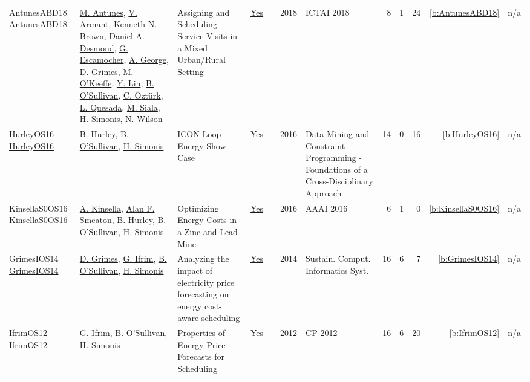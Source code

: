 {\begin{longtable}{>{\raggedright\arraybackslash}p{3cm}>{\raggedright\arraybackslash}p{6cm}>{\raggedright\arraybackslash}p{6.5cm}rrrp{2.5cm}rrrrr}
AntunesABD18 \href{https://doi.org/10.1109/ICTAI.2018.00027}{AntunesABD18} & \hyperref[auth:a884]{M. Antunes}, \hyperref[auth:a885]{V. Armant}, \hyperref[auth:a222]{Kenneth N. Brown}, \hyperref[auth:a886]{Daniel A. Desmond}, \hyperref[auth:a887]{G. Escamocher}, \hyperref[auth:a888]{A. George}, \hyperref[auth:a182]{D. Grimes}, \hyperref[auth:a889]{M. O'Keeffe}, \hyperref[auth:a890]{Y. Lin}, \hyperref[auth:a16]{B. O'Sullivan}, \hyperref[auth:a136]{C. {\"{O}}zt{\"{u}}rk}, \hyperref[auth:a891]{L. Quesada}, \hyperref[auth:a130]{M. Siala}, \hyperref[auth:a17]{H. Simonis}, \hyperref[auth:a832]{N. Wilson} & Assigning and Scheduling Service Visits in a Mixed Urban/Rural Setting & \href{../works/AntunesABD18.pdf}{Yes} & \cite{AntunesABD18} & 2018 & ICTAI 2018 & 8 & 1 & 24 & \ref{b:AntunesABD18} & n/a\\
HurleyOS16 \href{https://doi.org/10.1007/978-3-319-50137-6_15}{HurleyOS16} & \hyperref[auth:a892]{B. Hurley}, \hyperref[auth:a16]{B. O'Sullivan}, \hyperref[auth:a17]{H. Simonis} & {ICON} Loop Energy Show Case & \href{../works/HurleyOS16.pdf}{Yes} & \cite{HurleyOS16} & 2016 & Data Mining and Constraint Programming - Foundations of a Cross-Disciplinary Approach & 14 & 0 & 16 & \ref{b:HurleyOS16} & n/a\\
KinsellaS0OS16 \href{https://doi.org/10.1609/aaai.v30i2.19079}{KinsellaS0OS16} & \hyperref[auth:a1381]{A. Kinsella}, \hyperref[auth:a1382]{Alan F. Smeaton}, \hyperref[auth:a892]{B. Hurley}, \hyperref[auth:a16]{B. O'Sullivan}, \hyperref[auth:a17]{H. Simonis} & Optimizing Energy Costs in a Zinc and Lead Mine & \href{../works/KinsellaS0OS16.pdf}{Yes} & \cite{KinsellaS0OS16} & 2016 & AAAI 2016 & 6 & 1 & 0 & \ref{b:KinsellaS0OS16} & n/a\\
GrimesIOS14 \href{https://doi.org/10.1016/j.suscom.2014.08.009}{GrimesIOS14} & \hyperref[auth:a182]{D. Grimes}, \hyperref[auth:a183]{G. Ifrim}, \hyperref[auth:a16]{B. O'Sullivan}, \hyperref[auth:a17]{H. Simonis} & Analyzing the impact of electricity price forecasting on energy cost-aware scheduling & \href{../works/GrimesIOS14.pdf}{Yes} & \cite{GrimesIOS14} & 2014 & Sustain. Comput. Informatics Syst. & 16 & 6 & 7 & \ref{b:GrimesIOS14} & n/a\\
IfrimOS12 \href{https://doi.org/10.1007/978-3-642-33558-7_68}{IfrimOS12} & \hyperref[auth:a183]{G. Ifrim}, \hyperref[auth:a16]{B. O'Sullivan}, \hyperref[auth:a17]{H. Simonis} & Properties of Energy-Price Forecasts for Scheduling & \href{../works/IfrimOS12.pdf}{Yes} & \cite{IfrimOS12} & 2012 & CP 2012 & 16 & 6 & 20 & \ref{b:IfrimOS12} & n/a\\
\end{longtable}
}

